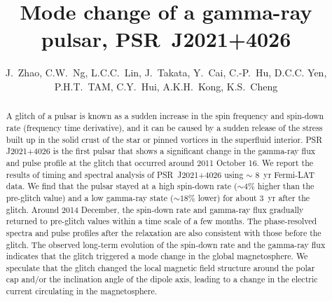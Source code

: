\documentclass[12pt,preprint]{aastex}
\begin{document}
\title{Mode change of a gamma-ray pulsar, PSR~J2021+4026}
\author{J.~Zhao, C.W.~Ng, L.C.C.~Lin, J.~Takata,
  Y.~Cai, C.-P.~Hu, D.C.C. Yen, P.H.T.~TAM,
  C.Y.~Hui, A.K.H.~Kong, K.S.~Cheng
}

\begin{abstract}
  A glitch of a pulsar is known as a sudden increase in the spin frequency and spin-down rate (frequency time derivative), and it can be caused by a sudden release of the stress built up in the solid crust of the star or pinned vortices in the superfluid interior. 
  PSR J2021+4026 is the first pulsar that shows a significant change in the gamma-ray flux and pulse profile at the glitch that occurred around 2011
  October 16.
  We report the results of timing and spectral analysis of PSR~J2021+4026 using $\sim$ 8~yr Fermi-LAT data.  
  We find that the pulsar stayed at a high spin-down rate ($\sim 4\%$ higher than the pre-glitch value) and a low gamma-ray state ($\sim 18\%$ lower) for about 3~yr after the glitch. 
  Around 2014 December, the spin-down rate and gamma-ray
  flux gradually returned to pre-glitch values
  within a time scale of a few months. 
  The phase-resolved spectra and pulse profiles after the relaxation are also consistent with those before the glitch. 
  The observed long-term evolution of the spin-down rate and the gamma-ray flux indicates that the glitch triggered a mode change in the
  global  magnetosphere.
  We speculate that the glitch changed the local magnetic field structure around the polar cap and/or the inclination angle of the dipole axis, leading to
  a change in the electric current circulating in the magnetosphere. 

  
\end{abstract}
\end{document}
